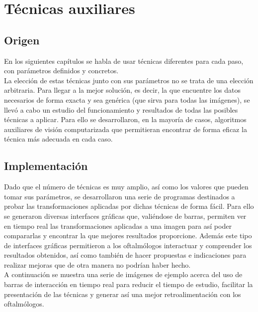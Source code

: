 \chapter{Técnicas auxiliares}
\section{Origen}
En los siguientes capítulos se habla de usar técnicas diferentes
para cada paso, con parámetros definidos y concretos. \\
La elección de estas técnicas junto con sus parámetros no se trata de
una elección arbitraria. Para llegar a la mejor solución, es decir, la
que encuentre los datos necesarios de forma exacta y sea genérica (que
sirva para todas las imágenes), se llevó a cabo un estudio del
funcionamiento y resultados de todas las posibles técnicas a aplicar.
Para ello se desarrollaron, en la mayoría de casos, algoritmos
auxiliares de visión computarizada que permitieran encontrar de forma
eficaz la técnica más adecuada en cada caso.

\section{Implementación}
Dado que el número de técnicas es muy amplio, así como los valores que
pueden tomar sus parámetros, se desarrollaron una serie de programas
destinados a probar las transformaciones aplicadas por dichas técnicas
de forma fácil. Para ello se generaron diversas interfaces gráficas
que, valiéndose de barras, permiten ver en tiempo real las
transformaciones aplicadas a una imagen para así poder compararlas y
encontrar la que mejores resultados proporcione. Además este tipo de
interfaces gráficas permitieron a los oftalmólogos interactuar y
comprender los resultados obtenidos, así como también de hacer
propuestas e indicaciones para realizar mejoras que de otra manera no
podrían haber hecho. \\

A continuación se muestra una serie de imágenes de ejemplo acerca del
uso de barras de interacción en tiempo real para reducir el tiempo de
estudio, facilitar la presentación de las técnicas y generar así una
mejor retroalimentación con los oftalmólogos.

